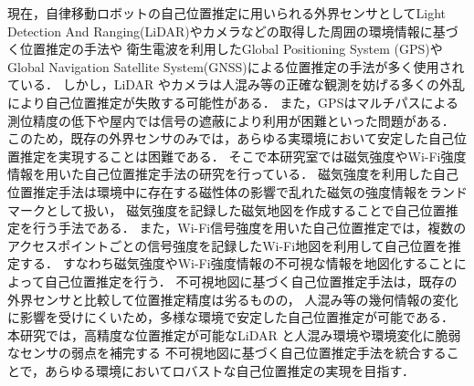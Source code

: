 現在，自律移動ロボットの自己位置推定に用いられる外界センサとしてLight Detection And Ranging(LiDAR)やカメラなどの取得した周囲の環境情報に基づく位置推定の手法や
衛生電波を利用したGlobal Positioning System (GPS)やGlobal Navigation Satellite System(GNSS)による位置推定の手法が多く使用されている．
しかし，LiDAR やカメラは人混み等の正確な観測を妨げる多くの外乱により自己位置推定が失敗する可能性がある\cite{wulf2005using,hu21doe}．
また，GPSはマルチパスによる測位精度の低下や屋内では信号の遮蔽により利用が困難といった問題がある\cite{hsu2017multiple,hailu2024theories}．
このため，既存の外界センサのみでは，あらゆる実環境において安定した自己位置推定を実現することは困難である．
そこで本研究室では磁気強度やWi-Fi強度情報を用いた自己位置推定手法の研究を行っている．
磁気強度を利用した自己位置推定手法は環境中に存在する磁性体の影響で乱れた磁気の強度情報をランドマークとして扱い，
磁気強度を記録した磁気地図を作成することで自己位置推定を行う手法である．
また，Wi-Fi信号強度を用いた自己位置推定では，複数のアクセスポイントごとの信号強度を記録したWi-Fi地図を利用して自己位置を推定する．
すなわち磁気強度やWi-Fi強度情報の不可視な情報を地図化することによって自己位置推定を行う．
不可視地図に基づく自己位置推定手法は，既存の外界センサと比較して位置推定精度は劣るものの，
人混み等の幾何情報の変化に影響を受けにくいため，多様な環境で安定した自己位置推定が可能である．
本研究では，高精度な位置推定が可能なLiDAR と人混み環境や環境変化に脆弱なセンサの弱点を補完する
不可視地図に基づく自己位置推定手法を統合することで，あらゆる環境においてロバストな自己位置推定の実現を目指す．

